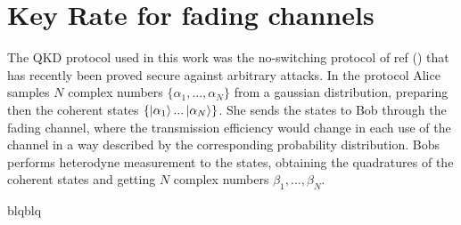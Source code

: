 \documentclass[%
 reprint,
 amsmath,amssymb,
 aps,
]{revtex4-1}
\begin{document}
\section{Key Rate for fading channels}
The QKD protocol used in this work was the no-switching protocol of ref () that has recently been proved secure against arbitrary attacks. In the protocol Alice samples $N$ complex numbers $\{\alpha_1,...,\alpha_N\}$ from a gaussian distribution, preparing then the coherent states $\{\ket{\alpha_1}...\ket{\alpha_N}\}$. She sends the states to Bob through the fading channel, where the transmission efficiency would change in each use of the channel in a way described by the corresponding probability distribution. Bobs performs heterodyne measurement to the states, obtaining the quadratures of the coherent states and getting $N$ complex numbers $\beta_1,...,\beta_N$.




blqblq
\end{document}
